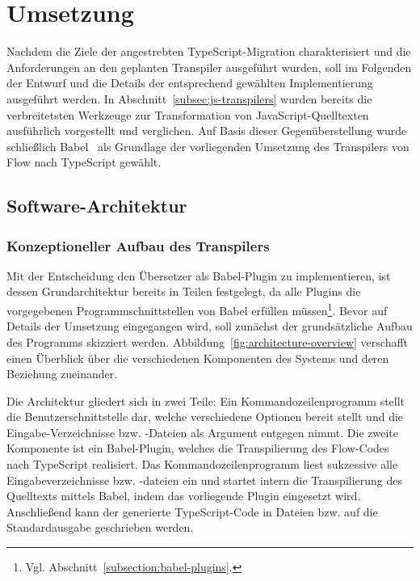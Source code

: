 \chapter{Umsetzung}
\label{chap:implementation}

Nachdem die Ziele der angestrebten TypeScript-Migration charakterisiert und die Anforderungen an den geplanten Transpiler ausgeführt wurden, soll im Folgenden der Entwurf und die Details der entsprechend gewählten Implementierung ausgeführt werden. In Abschnitt~\ref{subsec:js-transpilers} wurden bereits die verbreitetsten Werkzeuge zur Transformation von JavaScript-Quelltexten ausführlich vorgestellt und verglichen. Auf Basis dieser Gegenüberstellung wurde schließlich Babel~\autocite{BABEL} als Grundlage der vorliegenden Umsetzung des Transpilers von Flow nach TypeScript gewählt.

\section{Software-Architektur}

\subsection{Konzeptioneller Aufbau des Transpilers}

Mit der Entscheidung den Übersetzer als Babel-Plugin zu implementieren, ist dessen Grundarchitektur bereits in Teilen festgelegt, da alle Plugins die vorgegebenen Programmschnittstellen von Babel erfüllen müssen\footnote{Vgl. Abschnitt~\ref{subsection:babel-plugins}.}. Bevor auf Details der Umsetzung eingegangen wird, soll zunächst der grundsätzliche Aufbau des Programms skizziert werden. Abbildung~\ref{fig:architecture-overview} verschafft einen Überblick über die verschiedenen Komponenten des Systems und deren Beziehung zueinander.

Die Architektur gliedert sich in zwei Teile: Ein Kommandozeilenprogramm stellt die Benutzerschnittstelle dar, welche verschiedene Optionen bereit stellt und die Eingabe-Verzeichnisse bzw. -Dateien als Argument entgegen nimmt. Die zweite Komponente ist ein Babel-Plugin, welches die Transpilierung des Flow-Codes nach TypeScript realisiert. Das Kommandozeilenprogramm liest sukzessive alle Eingabeverzeichnisse bzw. -dateien ein und startet intern die Transpilierung des Quelltexts mittels Babel, indem das vorliegende Plugin eingesetzt wird. Anschließend kann der generierte TypeScript-Code in Dateien bzw. auf die Standardausgabe geschrieben werden.

